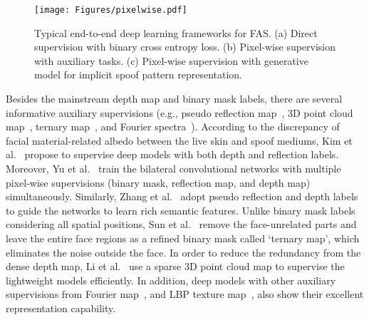 \documentclass[10pt,journal,compsoc]{IEEEtran}
\begin{document}
 
\begin{figure}
\centering
\texttt{[image: Figures/pixelwise.pdf]}
  \caption{ 
   Typical end-to-end deep learning frameworks for FAS. (a) Direct supervision with binary cross entropy loss. (b) Pixel-wise supervision with auxiliary tasks. (c) Pixel-wise supervision with generative model for implicit spoof pattern representation.
  }
\label{fig:pixelwise}
\end{figure}


 Besides the mainstream depth map and binary mask labels, there are several informative auxiliary supervisions (e.g., pseudo reflection map~\cite{kim2019basn,yu2020face,zhang2020celeba}, 3D point cloud map~\cite{li3dpc}, ternary map~\cite{sun2020face}, and Fourier spectra~\cite{roy2021bi}). According to the discrepancy of facial material-related albedo between the live skin and spoof mediums, Kim et al.~\cite{kim2019basn} propose to supervise deep models with both depth and reflection labels. Moreover, Yu et al.~\cite{yu2020face} train the bilateral convolutional networks with multiple pixel-wise supervisions (binary mask, reflection map, and depth map) simultaneously. Similarly, Zhang et al.~\cite{zhang2020celeba} adopt pseudo reflection and depth labels to guide the networks to learn rich semantic features. Unlike binary mask labels considering all spatial positions, Sun et al.~\cite{sun2020face} remove the face-unrelated parts and leave the entire face regions as a refined binary mask called `ternary map', which eliminates the noise outside the face. In order to reduce the redundancy from the dense depth map, Li et al.~\cite{li3dpc} use a sparse 3D point cloud map to supervise the lightweight models efficiently. In addition, deep models with other auxiliary supervisions from Fourier map~\cite{jourabloo2018face,roy2021bi}, and LBP texture map~\cite{zhang2020face}, also show their excellent representation capability.  
\end{document}

